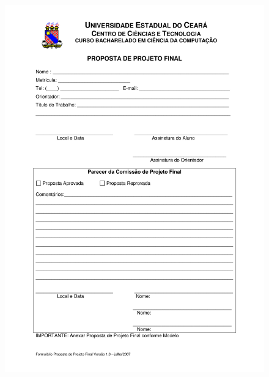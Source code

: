 \clearpage
\large{}
\label{anx:proposta}
\begin{figure}[htbp]
\centering
\includegraphics[scale=0.6]{requisitos/Formulario_Proposta_Projeto_Final.pdf}
\end{figure}

